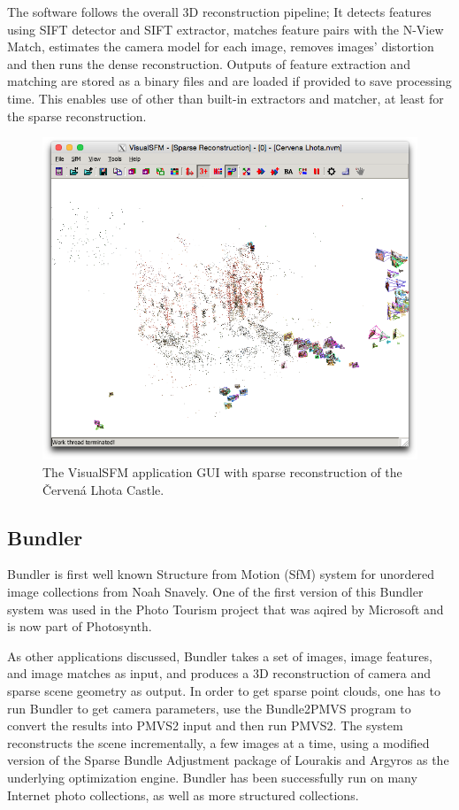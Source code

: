 The software follows the overall 3D reconstruction pipeline; It detects features using SIFT detector and SIFT extractor, matches feature pairs with the N-View Match, estimates the camera model for each image, removes images' distortion and then runs the dense reconstruction. Outputs of feature extraction and matching are stored as a binary files and are loaded if provided to save processing time. This enables use of other than built-in extractors and matcher, at least for the sparse reconstruction. \cite{www:visual_sfm}

\begin{figure}[ht]
	\begin{center}
		\includegraphics[keepaspectratio,width=\textwidth]{fig/VisualSFM.png}
	\end{center}
	\caption{The VisualSFM application GUI with sparse reconstruction of the Červená Lhota Castle.}
	\label{fig:visualsfm}
\end{figure}

\subsection*{Bundler}
Bundler is first well known Structure from Motion (SfM) system for unordered image collections from Noah Snavely. One of the first version of this Bundler system was used in the Photo Tourism project that was aqired by Microsoft and is now part of Photosynth. 

As other applications discussed, Bundler takes a set of images, image features, and image matches as input, and produces a 3D reconstruction of camera and sparse scene geometry as output. In order to get sparse point clouds, one has to run Bundler to get camera parameters, use the Bundle2PMVS program to convert the results into PMVS2 input and then run PMVS2. The system reconstructs the scene incrementally, a few images at a time, using a modified version of the Sparse Bundle Adjustment package of Lourakis and Argyros as the underlying optimization engine. Bundler has been successfully run on many Internet photo collections, as well as more structured collections. \cite{www:bundler}

